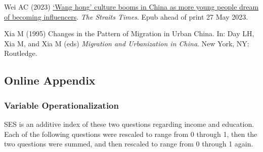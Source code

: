 \documentclass[
  letterpaper,
  DIV=11,
  numbers=noendperiod]{scrartcl}
\newlength{\cslhangindent}
\newlength{\cslentryspacingunit} %
\newenvironment{CSLReferences}[2] %
 {%
  \setlength{\parindent}{0pt}
  \ifodd #1
  \let\oldpar\par
  \def\par{\hangindent=\cslhangindent\oldpar}
  \fi
  \setlength{\parskip}{#2\cslentryspacingunit}
 }%
 {}
\begin{document}
\begin{CSLReferences}{1}{0}
\leavevmode{}%
Wei AC (2023)
\href{https://www.straitstimes.com/asia/east-asia/wang-hong-culture-booms-in-china-as-more-young-people-dream-of-becoming-influencers}{{`}Wang
hong{'} culture booms in China as more young people dream of becoming
influencers}. \emph{The Straits Times}. Epub ahead of print 27 May 2023.

\leavevmode{}%
Xia M (1995) Changes in the {Pattern} of {Migration} in {Urban} {China}.
In: Day LH, Xia M, and Xia M (eds) \emph{Migration and {Urbanization} in
{China}}. New York, NY: Routledge.

\end{CSLReferences}

\newpage{}

\hypertarget{online-appendix}{%
\subsection{Online Appendix}\label{online-appendix}}

\hypertarget{variable-operationalization}{%
\subsubsection{Variable
Operationalization}\label{variable-operationalization}}

SES is an additive index of these two questions regarding income and
education. Each of the following questions were rescaled to range from 0
through 1, then the two questions were summed, and then rescaled to
range from 0 through 1 again.
\end{document}
